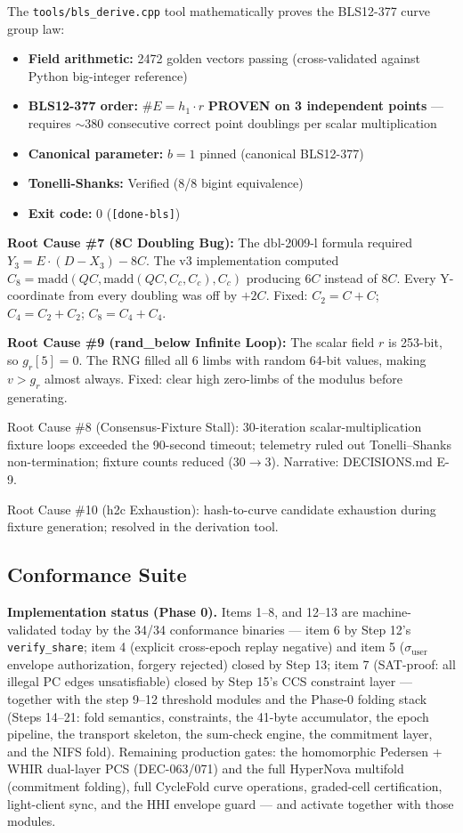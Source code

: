 \documentclass[11pt, a4paper]{article}
\begin{document}
The \texttt{tools/bls\_derive.cpp} tool mathematically proves the BLS12-377 curve group law:

\begin{itemize}
    \item \textbf{Field arithmetic:} 2472 golden vectors passing (cross-validated against Python big-integer reference)
    \item \textbf{BLS12-377 order:} $\#E = h_1 \cdot r$ \textbf{PROVEN on 3 independent points} --- requires $\sim 380$ consecutive correct point doublings per scalar multiplication
    \item \textbf{Canonical parameter:} $b = 1$ pinned (canonical BLS12-377)
    \item \textbf{Tonelli-Shanks:} Verified (8/8 bigint equivalence)
    \item \textbf{Exit code:} 0 (\texttt{[done-bls]})
\end{itemize}

\textbf{Root Cause \#7 (8C Doubling Bug):} The dbl-2009-l formula required $Y_3 = E \cdot (D - X_3) - 8C$. The v3 implementation computed $C_8 = \text{madd}(QC, \text{madd}(QC, C_c, C_c), C_c)$ producing $6C$ instead of $8C$. Every Y-coordinate from every doubling was off by $+2C$. Fixed: $C_2 = C + C$; $C_4 = C_2 + C_2$; $C_8 = C_4 + C_4$.

\textbf{Root Cause \#9 (rand\_below Infinite Loop):} The scalar field $r$ is 253-bit, so $g_r[5] = 0$. The RNG filled all 6 limbs with random 64-bit values, making $v > g_r$ almost always. Fixed: clear high zero-limbs of the modulus before generating.

Root Cause \#8 (Consensus-Fixture Stall): 30-iteration scalar-multiplication fixture loops exceeded the 90-second timeout; telemetry ruled out Tonelli--Shanks non-termination; fixture counts reduced ($30\to3$). Narrative: DECISIONS.md E-9.

Root Cause \#10 (h2c Exhaustion): hash-to-curve candidate exhaustion during fixture generation; resolved in the derivation tool.


\subsection{Conformance Suite}
\textbf{Implementation status (Phase 0).} Items 1--8, and 12--13 are machine-validated today by the
34/34 conformance binaries --- item 6 by Step 12's \texttt{verify\_share}; item 4 (explicit
cross-epoch replay negative) and item 5 ($\sigma_{\mathrm{user}}$ envelope authorization,
forgery rejected) closed by Step 13; item 7 (SAT-proof: all illegal PC edges unsatisfiable)
closed by Step 15's CCS constraint layer --- together with the step 9--12 threshold modules
and the Phase-0 folding stack (Steps 14--21: fold semantics, constraints, the 41-byte
accumulator, the epoch pipeline, the transport skeleton, the sum-check engine, the commitment
layer, and the NIFS fold). Remaining production gates: the homomorphic Pedersen + WHIR
dual-layer PCS (DEC-063/071) and the full HyperNova multifold (commitment folding), full
CycleFold curve operations, graded-cell certification, light-client sync, and the HHI envelope
guard --- and activate together with those modules.
\end{document}
